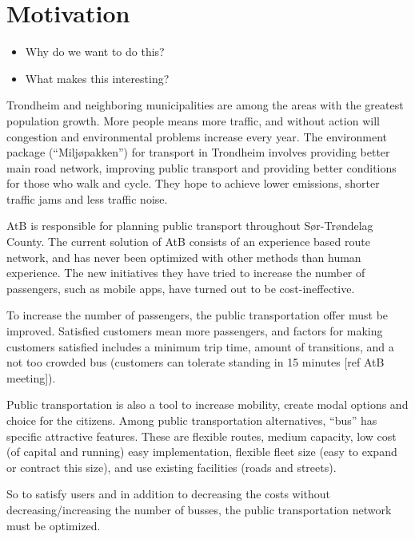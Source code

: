 \section{Motivation}
\begin{itemize}
\item Why do we want to do this?
\item What makes this interesting?
\end{itemize}
Trondheim and neighboring municipalities are among the areas with the greatest population growth. More people means more traffic, and without action will congestion and environmental problems increase every year. The environment package (“Miljøpakken”) for transport in Trondheim involves providing better main road network, improving public transport and providing better conditions for those who walk and cycle. They hope to achieve lower emissions, shorter traffic jams and less traffic noise.

AtB is responsible for planning public transport throughout Sør-Trøndelag County. The current solution of AtB consists of an experience based route network, and has never been optimized with other methods than human experience. The new initiatives they have tried to increase the number of passengers, such as mobile apps, have turned out to be cost-ineffective. 

To increase the number of passengers, the public transportation offer must be improved. Satisfied customers mean more passengers, and factors for making customers satisfied includes a minimum trip time, amount of transitions, and a not too crowded bus (customers can tolerate standing in 15 minutes [ref AtB meeting]). 

Public transportation is also a tool to increase mobility, create modal options and choice for the citizens. Among public transportation alternatives, “bus” has specific attractive features. These are flexible routes, medium capacity, low cost (of capital and running) easy implementation, flexible fleet size (easy to expand or contract this size), and use existing facilities (roads and streets).

So to satisfy users and in addition to decreasing the costs without decreasing/increasing the number of busses, the public transportation network must be optimized. 







